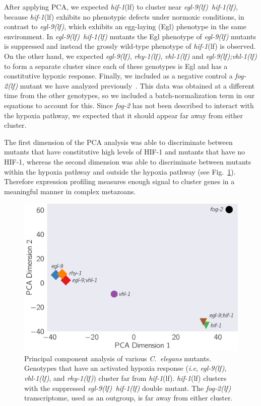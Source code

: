 \documentclass[9pt,twocolumn,twoside]{pnas-new}
\newcommand{\cel}{\emph{C.~elegans}}
\newcommand{\gene}[1]{\emph{#1}}
\newcommand{\fog}{\emph{\mbox{fog-2(lf)}}}
\newcommand{\egl}{\emph{\mbox{egl-9}(lf)}}
\newcommand{\rhy}{\emph{\mbox{rhy-1}(lf)}}
\newcommand{\vhl}{\emph{\mbox{vhl-1}(lf)}}
\newcommand{\eglvhl}{\emph{\mbox{egl-9(lf);vhl-1(lf)}}}
\newcommand{\eglhif}{\emph{\mbox{egl-9(lf)}~\mbox{hif-1(lf)}}}
\newcommand{\hif}{\emph{\mbox{hif-1}}(lf)}
\newcommand{\hifp}{HIF-1}
\begin{document}
After applying PCA, we expected \hif{} to cluster near \eglhif{}, because
\hif{} exhibits no phenotypic defects under normoxic conditions, in contrast to
\egl{}, which exhibits an egg-laying (Egl) phenotype in the same environment.
In \eglhif{} mutants the Egl phenotype of \egl{} mutants is suppressed and instead
the grossly wild-type phenotype of \hif{} is observed. On the other hand, we
expected \egl{}, \rhy{}, \vhl{} and \eglvhl{} to form a separate cluster since
each of these genotypes is Egl and has a constitutive hypoxic response. Finally,
we included as a negative control a \fog{} mutant we have analyzed
previously~\cite{Angeles-Albores2016a}. This data was obtained at a different
time from the other genotypes, so we included a batch-normalization term in our
equations to account for this. Since \gene{fog-2} has not been described
to interact with the hypoxia pathway, we expected that it should appear far away
from either cluster.

The first dimension of the PCA analysis was able to discriminate between mutants
that have constitutive high levels of \hifp{} and mutants that have no \hifp{},
whereas the second dimension was able to discriminate between mutants within the
hypoxia pathway and outside the hypoxia pathway (see Fig.~\ref{fig:pca}).
Therefore expression profiling measures enough signal to cluster genes in a
meaningful manner in complex metazoans.

\begin{figure}%
\centering
\includegraphics[width=0.75\linewidth]{figs/pca.pdf}
\caption{
Principal component analysis of various \cel{} mutants. Genotypes that have an
activated hypoxia response (\emph{i.e}, \egl{}, \vhl{}, and \rhy{}) cluster far
from \hif{}. \hif{} clusters with the suppressed \eglhif{} double mutant.
The \fog{} transcriptome, used as an outgroup, is far away from either cluster.
}
\label{fig:pca}
\end{figure}
\end{document}

